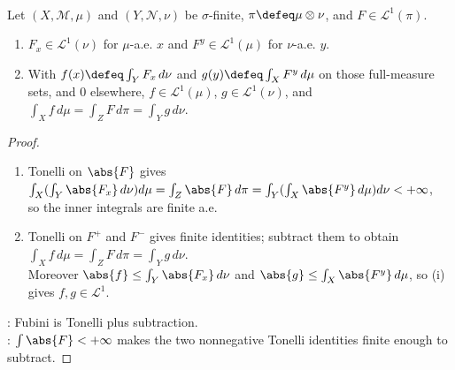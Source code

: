 \begin{theorem} \label{thm:fubini-sigma-finite-product-measures} \\
Let $(X,\mathcal{M},\mu)$ and $(Y,\mathcal{N},\nu)$ be $\sigma$-finite, $\pi\defeq\mu\otimes\nu$, and $F\in\mathscr{L}^1(\pi)$.
\begin{enumerate}[label=(\roman*)]
\setlength{\itemsep}{0pt}
\item $F_x\in\mathscr{L}^1(\nu)$ for $\mu$-a.e. $x$ and $F^y\in\mathscr{L}^1(\mu)$ for $\nu$-a.e. $y$.
\item With $f(x)\defeq\int_YF_x\,d\nu$ and $g(y)\defeq\int_XF^y\,d\mu$ on those full-measure sets, and $0$ elsewhere, $f\in\mathscr{L}^1(\mu)$, $g\in\mathscr{L}^1(\nu)$, and $\int_Xf\,d\mu=\int_ZF\,d\pi=\int_Yg\,d\nu$.
\end{enumerate}
\begin{proof}
\begin{enumerate}[label=(\roman*)]
\setlength{\itemsep}{0pt}
\item Tonelli on $\abs{F}$ gives $\int_X(\int_Y\abs{F_x}\,d\nu)d\mu=\int_Z\abs{F}\,d\pi=\int_Y(\int_X\abs{F^y}\,d\mu)d\nu<+\infty$,\\
so the inner integrals are finite a.e.
\item Tonelli on $F^+$ and $F^-$ gives finite identities; subtract them to obtain $\int_Xf\,d\mu=\int_ZF\,d\pi=\int_Yg\,d\nu$.\\
Moreover $\abs{f}\leq\int_Y\abs{F_x}\,d\nu$ and $\abs{g}\leq\int_X\abs{F^y}\,d\mu$, so (i) gives $f,g\in\mathscr{L}^1$.
\end{enumerate}
: Fubini is Tonelli plus subtraction.\\
: $\int\abs{F}<+\infty$ makes the two nonnegative Tonelli identities finite enough to subtract.
\end{proof}
\end{theorem}

